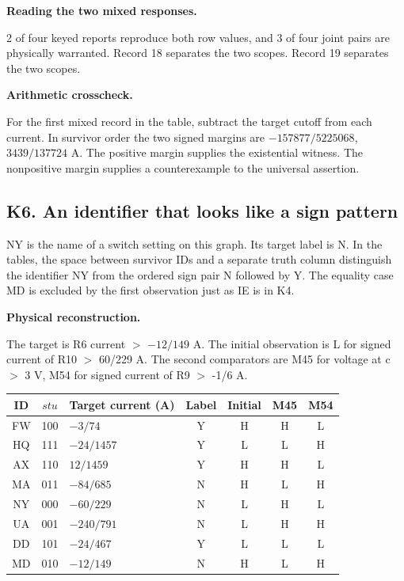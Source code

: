 \documentclass[12pt,letterpaper]{article}
\newcommand{\reading}[2]{\par\smallskip\textsf{\color{accent}\bfseries #1}\enspace #2\par}
\begin{document}
\reading{Reading the two mixed responses.}{}2 of four keyed reports reproduce both row values, and 3 of four joint pairs are physically warranted. Record 18 separates the two scopes. Record 19 separates the two scopes.

\reading{Arithmetic crosscheck.}{} For the first mixed record in the table, subtract the target cutoff from each current. In survivor order the two signed margins are $-157877/5225068$, $3439/137724$ A. The positive margin supplies the existential witness. The nonpositive margin supplies a counterexample to the universal assertion.

\clearpage\subsection*{K6. An identifier that looks like a sign pattern}

NY is the name of a switch setting on this graph. Its target label is N. In the tables, the space between survivor IDs and a separate truth column distinguish the identifier NY from the ordered sign pair N followed by Y. The equality case MD is excluded by the first observation just as IE is in K4.

\reading{Physical reconstruction.}{} The target is R6 current $>$ $-12/149$ A. The initial observation is L for signed current of R10 $>$ 60/229 A. The second comparators are M45 for voltage at c $>$ 3 V, M54 for signed current of R9 $>$ -1/6 A.

\begin{center}{\small\setlength{\tabcolsep}{4pt}\begin{tabularx}{\linewidth}{@{}ccYcccc@{}}\toprule
ID & $stu$ & Target current (A) & Label & Initial & M45 & M54\\\midrule
FW & 100 & $-3/74$ & Y & H & H & L\\
HQ & 111 & $-24/1457$ & Y & L & L & H\\
AX & 110 & $12/1459$ & Y & H & H & L\\
MA & 011 & $-84/685$ & N & H & L & H\\
NY & 000 & $-60/229$ & N & L & H & L\\
UA & 001 & $-240/791$ & N & L & H & H\\
DD & 101 & $-24/467$ & Y & L & L & L\\
MD & 010 & $-12/149$ & N & H & L & H\\
\bottomrule\end{tabularx}}\end{center}
\end{document}
